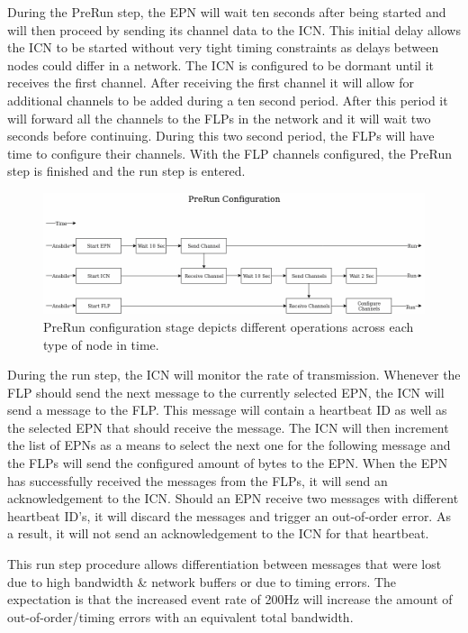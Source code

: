 \documentclass[]{article}
\begin{document}
During the PreRun step, the EPN will wait ten seconds after being started and will then proceed by sending its channel data to the ICN. This initial delay allows the ICN to be started without very tight timing constraints as delays between nodes could differ in a network. The ICN is configured to be dormant until it receives the first channel. After receiving the first channel it will allow for additional channels to be added during a ten second period. After this period it will forward all the channels to the FLPs in the network and it will wait two seconds before continuing. During this two second period, the FLPs will have time to configure their channels. With the FLP channels configured, the PreRun step is finished and the run step is entered.

\begin{center}
	\begin{figure}[H]
		\includegraphics[width=\textwidth]{images/no-zookeeper-flow}
		\caption{PreRun configuration stage depicts different operations across each type of node in time.}
		\label{fig:ssh}
	\end{figure}
\end{center}

During the run step, the ICN will monitor the rate of transmission. Whenever the FLP should send the next message to the currently selected EPN, the ICN will send a message to the FLP. This message will contain a heartbeat ID as well as the selected EPN that should receive the message. The ICN will then increment the list of EPNs as a means to select the next one for the following message and the FLPs will send the configured amount of bytes to the EPN. When the EPN has successfully received the messages from the FLPs, it will send an acknowledgement to the ICN. Should an EPN receive two messages with different heartbeat ID’s, it will discard the messages and trigger an out-of-order error. As a result, it will not send an acknowledgement to the ICN for that heartbeat.

This run step procedure allows differentiation between messages that were lost due to high bandwidth \& network buffers or due to timing errors. The expectation is that the increased event rate of 200Hz will increase the amount of out-of-order/timing errors with an equivalent total bandwidth.
\end{document}
